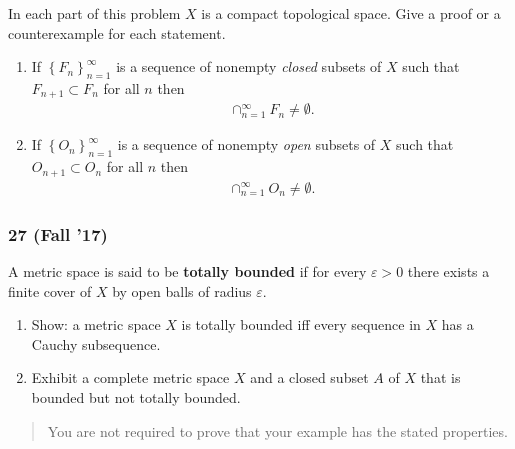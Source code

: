 \begin{problem}[?]

In each part of this problem \(X\) is a compact topological space. Give
a proof or a counterexample for each statement.

\begin{enumerate}
\def\labelenumi{\alph{enumi}.}
\item
  If \(\left\{{F_n }\right\}_{n=1}^\infty\) is a sequence of nonempty
  \emph{closed} subsets of \(X\) such that \(F_{n+1} \subset F_{n}\) for
  all \(n\) then
  \begin{align*}\cap^\infty_{n=1} F_n\neq \emptyset.\end{align*}
\item
  If \(\left\{{O_n}\right\}_{n=1}^\infty\) is a sequence of nonempty
  \emph{open} subsets of \(X\) such that \(O_{n+1} \subset O_n\) for all
  \(n\) then
  \begin{align*}\cap_{n=1}^\infty O_{n}\neq \emptyset.\end{align*}
\end{enumerate}

\end{problem}

\hypertarget{fall-17-1}{%
\subsubsection{27 (Fall '17)}\label{fall-17-1}}

\begin{problem}[?]

A metric space is said to be \textbf{totally bounded} if for every
\({\varepsilon}> 0\) there exists a finite cover of \(X\) by open balls
of radius \({\varepsilon}\).

\begin{enumerate}
\def\labelenumi{\alph{enumi}.}
\item
  Show: a metric space \(X\) is totally bounded iff every sequence in
  \(X\) has a Cauchy subsequence.
\item
  Exhibit a complete metric space \(X\) and a closed subset \(A\) of
  \(X\) that is bounded but not totally bounded.
\end{enumerate}

\begin{quote}
You are not required to prove that your example has the stated
properties.
\end{quote}

\end{problem}

